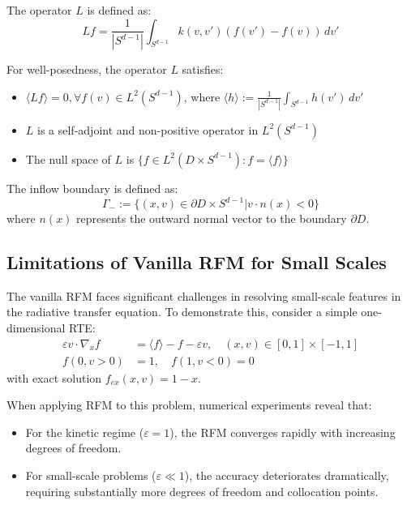 \documentclass[11pt]{article}
\begin{document}
The operator $L$ is defined as:
\begin{equation}
L f = \frac{1}{|S^{d-1}|} \int_{S^{d-1}} k(v,v')(f(v') - f(v)) \, dv'
\end{equation}

For well-posedness, the operator $L$ satisfies:
\begin{itemize}
    \item $\langle L f \rangle = 0, \forall f(v) \in L^2(S^{d-1})$, where $\langle h \rangle := \frac{1}{|S^{d-1}|} \int_{S^{d-1}} h(v') \, dv'$ 
    \item $L$ is a self-adjoint and non-positive operator in $L^2(S^{d-1})$
    \item The null space of $L$ is $\{f \in L^2(D \times S^{d-1}) : f = \langle f \rangle \}$
\end{itemize}

The inflow boundary is defined as:
\begin{equation}
\Gamma_- := \{(x,v) \in \partial D \times S^{d-1} | v \cdot n(x) < 0\}
\end{equation}
where $n(x)$ represents the outward normal vector to the boundary $\partial D$.

\subsection{Limitations of Vanilla RFM for Small Scales}

The vanilla RFM faces significant challenges in resolving small-scale features in the radiative transfer equation. To demonstrate this, consider a simple one-dimensional RTE:
\begin{align}
\varepsilon v \cdot \nabla_x f &= \langle f \rangle - f - \varepsilon v, \quad (x,v) \in [0,1] \times [-1,1]\\
f(0, v > 0) &= 1, \quad f(1, v < 0) = 0
\end{align}
with exact solution $f_{ex}(x,v) = 1-x$.

When applying RFM to this problem, numerical experiments reveal that:
\begin{itemize}
    \item For the kinetic regime ($\varepsilon = 1$), the RFM converges rapidly with increasing degrees of freedom.
    \item For small-scale problems ($\varepsilon \ll 1$), the accuracy deteriorates dramatically, requiring substantially more degrees of freedom and collocation points.
\end{itemize}
\end{document}
